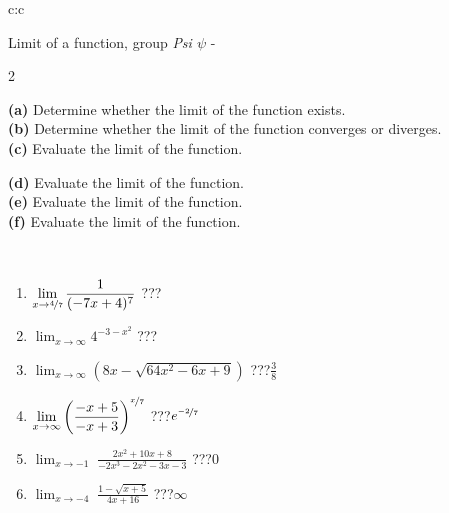\documentclass[10pt]{report}
\begin{document}
\newpage
\thispagestyle{empty}
\begin{tabular}{c:c}
\begin{minipage}[c][104.5mm][t]{0.5\linewidth}
\begin{center}
\vspace{5mm}
{\huge Limit of a function, group \textit{Psi $\psi$} -}\\[5mm]
\begin{minipage}{0.95\linewidth}
\begin{center}
{\small \begin{multicols}{2} \raggedright
\textbf{(a)} Determine whether the limit of the function exists. \\[1mm]
\textbf{(b)} Determine whether the limit of the function converges or diverges. \\[1mm]
\textbf{(c)} Evaluate the limit of the function. \par \columnbreak
\textbf{(d)} Evaluate the limit of the function. \\[1mm]
\textbf{(e)} Evaluate the limit of the function. \\[1mm]
\textbf{(f)} Evaluate the limit of the function. \\[1mm]
\end{multicols}
}
\end{center}
\end{minipage}
\\[1mm]
\begin{minipage}{0.79\linewidth}
\begin{center}
\begin{varwidth}{\linewidth}
\setlength{\itemsep}{0pt}
\begin{enumerate}
\normalsize
\item $\displaystyle\lim_{x\to\nicefrac{4}{7}}{\frac{1}{(-7x+4)^{7}}}$\quad \dotfill\; ???\;\dotfill \quad {}
\item $\displaystyle\lim_{x\to\infty}{4^{-3-x^2}}$\quad \dotfill\; ???\;\dotfill \quad {}
\item $\displaystyle\lim_{x\to\infty}{\left(8x - \sqrt{64x^2-6x+9}\right)}$\quad \dotfill\; ???\;\dotfill \quad $\frac{3}{8}$
\item $\displaystyle\lim_{x\to\infty}{\left( \frac{-x+5}{-x+3} \right)^{\nicefrac{x}{7}}}$\quad \dotfill\; ???\;\dotfill \quad $e^{\nicefrac{-2}{7}}$
\item $\displaystyle\lim_{x\to -1}{\;\frac{2x^2+10x+8}{-2x^3-2x^2-3x-3}}$\quad \dotfill\; ???\;\dotfill \quad $0$
\item $\displaystyle\lim_{x\to -4}{\;\frac{1-\sqrt{x+5}}{4x+16}}$\quad \dotfill\; ???\;\dotfill \quad $\infty$

\end{enumerate}
\end{varwidth}
\end{center}
\end{minipage}
\end{center}
\end{minipage}
\end{tabular}
\end{document}
